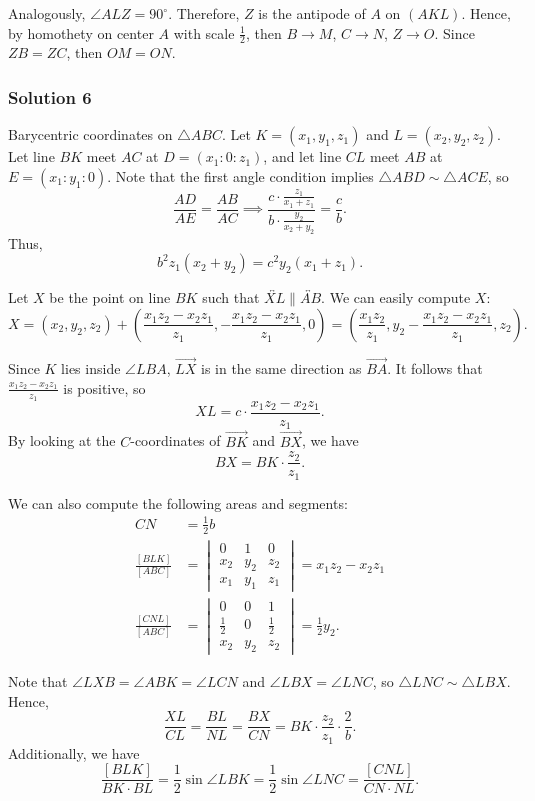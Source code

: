 \documentclass[11pt]{article}
\begin{document}
Analogously, $\angle{ALZ} = 90^{\circ}$. Therefore, $Z$ is the antipode of $A$ on $(AKL)$. Hence, by homothety on center $A$ with scale $\frac{1}{2}$, then $B \rightarrow M$, $C \rightarrow N$, $Z \rightarrow O$. Since $ZB = ZC$, then $OM = ON$. 
\newpage
\subsubsection{Solution 6}
Barycentric coordinates on $\triangle ABC$. Let $K=(x_1, y_1, z_1)$ and $L=(x_2, y_2, z_2)$. Let line $BK$ meet $AC$ at $D=(x_1:0:z_1)$, and let line $CL$ meet $AB$ at $E=(x_1:y_1:0)$. Note that the first angle condition implies $\triangle ABD \sim \triangle ACE$, so
\[
\frac{AD}{AE} = \frac{AB}{AC} \implies \frac{c \cdot \frac{z_1}{x_1+z_1}}{b \cdot \frac{y_2}{x_2+y_2}} = \frac{c}{b}.
\]
Thus,
\[
\boxed{b^2z_1(x_2+y_2) = c^2y_2(x_1+z_1)}.
\]

\noindent Let $X$ be the point on line $BK$ such that $\overleftrightarrow{XL} \parallel \overleftrightarrow{AB}$. We can easily compute $X$:
\[
X = (x_2,y_2,z_2) + \left( \frac{x_1z_2-x_2z_1}{z_1}, -\frac{x_1z_2-x_2z_1}{z_1}, 0 \right) = \left( \frac{x_1z_2}{z_1}, y_2 - \frac{x_1z_2-x_2z_1}{z_1}, z_2 \right).
\]

\noindent Since $K$ lies inside $\angle LBA$, $\overrightarrow{LX}$ is in the same direction as $\overrightarrow{BA}$. It follows that $\frac{x_1z_2-x_2z_1}{z_1}$ is positive, so
\[
XL = c \cdot \frac{x_1z_2-x_2z_1}{z_1}.
\]
By looking at the $C$-coordinates of $\overrightarrow{BK}$ and $\overrightarrow{BX}$, we have
\[
BX = BK \cdot \frac{z_2}{z_1}.
\]

\noindent We can also compute the following areas and segments:
\begin{align*}
CN &= \frac{1}{2}b \\
\frac{[BLK]}{[ABC]} &=
\begin{vmatrix}
0 & 1 & 0 \\
x_2 & y_2 & z_2 \\
x_1 & y_1 & z_1
\end{vmatrix}
= x_1z_2 - x_2z_1 \\
\frac{[CNL]}{[ABC]} &=
\begin{vmatrix}
0 & 0 & 1 \\
\frac{1}{2} & 0 & \frac{1}{2} \\
x_2 & y_2 & z_2
\end{vmatrix}
= \frac{1}{2}y_2.
\end{align*}

\noindent Note that $\angle LXB = \angle ABK = \angle LCN$ and $\angle LBX = \angle LNC$, so $\triangle LNC \sim \triangle LBX$. Hence,
\[
\frac{XL}{CL} = \frac{BL}{NL} = \frac{BX}{CN} = BK \cdot \frac{z_2}{z_1} \cdot \frac{2}{b}. \tag{1}
\]
Additionally, we have
\[
\frac{[BLK]}{BK \cdot BL} = \frac{1}{2}\sin\angle LBK = \frac{1}{2}\sin\angle LNC = \frac{[CNL]}{CN \cdot NL}. \tag{2}
\]
\end{document}
